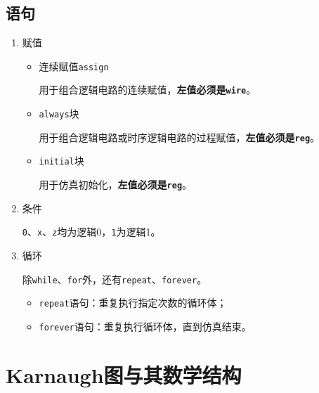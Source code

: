 \documentclass[UTF8,fontset=fandol,zihao=5]{ctexart}
\let\tt\texttt
\begin{document}
\subsection{语句}

\begin{enumerate}
  \item 赋值

\begin{itemize}
  \item 连续赋值\tt{assign}
  
  用于组合逻辑电路的连续赋值，\textbf{左值必须是\tt{wire}}。
  
  \item \tt{always}块
  
  用于组合逻辑电路或时序逻辑电路的过程赋值，\textbf{左值必须是\tt{reg}}。
  
  \item \tt{initial}块
  
  用于仿真初始化，\textbf{左值必须是\tt{reg}}。
\end{itemize}

  \item 条件

\tt{0}、\tt{x}、\tt{z}均为逻辑0，\tt{1}为逻辑1。

  \item 循环
  
  除\tt{while}、\tt{for}外，还有\tt{repeat}、\tt{forever}。

  \begin{itemize}
    \item \tt{repeat}语句：重复执行指定次数的循环体；

    \item \tt{forever}语句：重复执行循环体，直到仿真结束。
  \end{itemize}

\end{enumerate}

\section{Karnaugh图与其数学结构}
\end{document}
